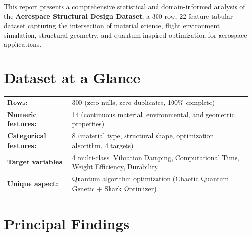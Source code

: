 \documentclass[11pt, a4paper]{report}
\begin{document}
This report presents a comprehensive statistical and domain-informed analysis of the \textbf{Aerospace Structural Design Dataset}, a 300-row, 22-feature tabular dataset capturing the intersection of material science, flight environment simulation, structural geometry, and quantum-inspired optimization for aerospace applications.

\section{Dataset at a Glance}

\begin{insightbox}
\begin{tabularx}{\textwidth}{lX}
\textbf{Rows:} & 300 (zero nulls, zero duplicates, 100\% complete) \\
\textbf{Numeric features:} & 14 (continuous material, environmental, and geometric properties) \\
\textbf{Categorical features:} & 8 (material type, structural shape, optimization algorithm, 4 targets) \\
\textbf{Target variables:} & 4 multi-class: Vibration Damping, Computational Time, Weight Efficiency, Durability \\
\textbf{Unique aspect:} & Quantum algorithm optimization (Chaotic Quantum Genetic + Shark Optimizer) \\
\end{tabularx}
\end{insightbox}

\section{Principal Findings}
\end{document}
